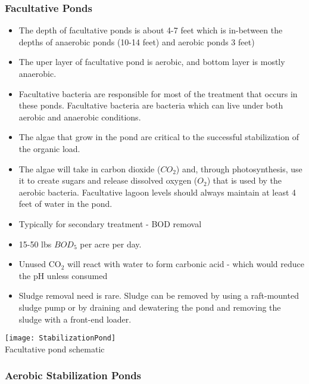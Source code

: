 \documentclass{article}
\begin{document}
\subsubsection{Facultative Ponds}	

\begin{itemize}
\item The depth of facultative ponds is about 4-7 feet which is in-between the depths of anaerobic ponds (10-14 feet) and aerobic ponds 3 feet)
\item The uper layer of facultative pond is aerobic, and bottom layer is mostly anaerobic.
\item Facultative bacteria are responsible for most of the treatment that occurs in these ponds.  Facultative bacteria are bacteria which can live under both aerobic and anaerobic conditions.
\item The algae that grow in the pond are critical to the successful stabilization of the organic load. 
\item The algae will take in carbon dioxide ($CO_2$) and, through photosynthesis, use it to create sugars and release dissolved oxygen ($O_2$) that is used by the aerobic bacteria. Facultative lagoon levels should always maintain at least 4 feet of water in the pond.
\item Typically for secondary treatment - BOD removal
\item 15-50 lbs $BOD_5$ per acre per day.
\item Unused CO$_2$ will react with water to form carbonic acid - which would reduce the pH unless consumed
\item Sludge removal need is rare.  Sludge can be removed by using a raft-mounted sludge pump or by draining and dewatering the pond and removing the sludge with a front-end loader.
\end{itemize} 

				\begin{sidewaysfigure}
\begin{center}
\texttt{[image: StabilizationPond]}\\
Facultative pond schematic
\end{center}
				\end{sidewaysfigure}
				
\subsubsection{Aerobic Stabilization Ponds}
	
\end{document}
